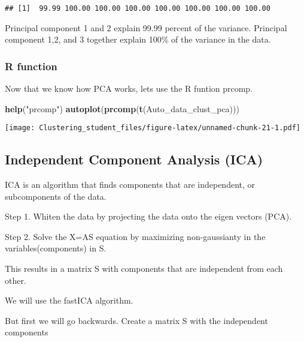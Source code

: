 \documentclass[11pt,]{article}
\newenvironment{Shaded}{\begin{snugshade}}{\end{snugshade}}
\newcommand{\KeywordTok}[1]{\textcolor[rgb]{0.13,0.29,0.53}{\textbf{#1}}}
\newcommand{\NormalTok}[1]{#1}
\newcommand{\StringTok}[1]{\textcolor[rgb]{0.31,0.60,0.02}{#1}}
\begin{document}
\begin{verbatim}
## [1]  99.99 100.00 100.00 100.00 100.00 100.00 100.00 100.00
\end{verbatim}

Principal component 1 and 2 explain 99.99 percent of the variance.
Principal component 1,2, and 3 together explain 100\% of the variance in
the data.

\hypertarget{r-function-2}{%
\subsubsection{R function}\label{r-function-2}}

Now that we know how PCA works, lets use the R funtion prcomp.

\begin{Shaded}
\begin{Highlighting}[]
\KeywordTok{help}\NormalTok{(}\StringTok{"prcomp"}\NormalTok{)}
\KeywordTok{autoplot}\NormalTok{(}\KeywordTok{prcomp}\NormalTok{(}\KeywordTok{t}\NormalTok{(Auto_data_clust_pca)))}
\end{Highlighting}
\end{Shaded}

\texttt{[image: Clustering\_student\_files/figure-latex/unnamed-chunk-21-1.pdf]}

\newpage

\hypertarget{independent-component-analysis-ica}{%
\subsection{Independent Component Analysis
(ICA)}\label{independent-component-analysis-ica}}

ICA is an algorithm that finds components that are independent, or
subcomponents of the data.

Step 1. Whiten the data by projecting the data onto the eigen vectors
(PCA).

Step 2. Solve the X=AS equation by maximizing non-gaussianty in the
variables(components) in S.

This results in a matrix S with components that are independent from
each other.

We will use the fastICA algorithm.

But first we will go backwards. Create a matrix S with the independent
components
\end{document}
